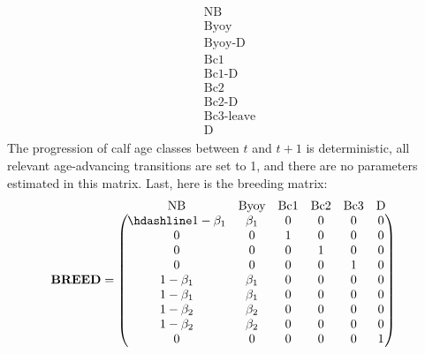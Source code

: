 \documentclass[
  12pt,
]{krantz}
\begin{document}
\[\begin{matrix}
\begin{matrix}
\text{NB} \\
\text{Byoy} \\
\text{Byoy-D} \\
\text{Bc1} \\
\text{Bc1-D} \\
\text{Bc2} \\
\text{Bc2-D} \\
\text{Bc3-leave} \\
\text{D}
\end{matrix}
\end{matrix}
\]
The progression of calf age classes between \(t\) and \(t+1\) is deterministic, all relevant age-advancing transitions are set to 1, and there are no parameters estimated in this matrix. Last, here is the breeding matrix:
\[
\begin{matrix}
& \\
\mathbf{BREED} =
\left ( \vphantom{ \begin{matrix} 12 \\ 12 \\ 12 \\ 12 \\ 12 \\ 12 \\ 12 \\ 12 \\ 12 \end{matrix} } \right .
\end{matrix}
\hspace{-1.2em}
\begin{matrix}
\text{NB} & \text{Byoy} & \text{Bc1} & \text{Bc2} & \text{Bc3} & \text{D} \\ \hdashline
1 - \beta_1 & \beta_1 & 0 & 0 & 0 & 0 \\
0 & 0 & 1 & 0 & 0 & 0 \\
0 & 0 & 0 & 1 & 0 & 0 \\
0 & 0 & 0 & 0 & 1 & 0 \\
1 - \beta_1 & \beta_1 & 0 & 0 & 0 & 0 \\
1 - \beta_1 & \beta_1 & 0 & 0 & 0 & 0 \\
1 - \beta_2 & \beta_2 & 0 & 0 & 0 & 0 \\
1 - \beta_2 & \beta_2 & 0 & 0 & 0 & 0 \\
0 & 0 & 0 & 0 & 0 & 1
\end{matrix}
\hspace{-0.2em}
\begin{matrix}
& \\
\left . \vphantom{ \begin{matrix} 12 \\ 12 \\ 12 \\ 12 \\ 12 \\ 12 \\ 12 \\ 12 \\ 12 \end{matrix} } \right )

\end{matrix}\]
\end{document}
